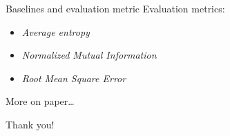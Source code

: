 \documentclass[xcolor={svgnames}]{beamer}
\begin{document}

\begin{frame}{Baselines and evaluation metric}
  Evaluation metrics:
  \begin{itemize}
    \item \emph{Average entropy}
    \item \emph{Normalized Mutual Information}
    \item \emph{Root Mean Square Error}
  \end{itemize}

  More on paper\ldots
\end{frame}


% 	
% 	


\begin{frame}[standout]
  \Huge Thank you!
\end{frame}

\end{document}
